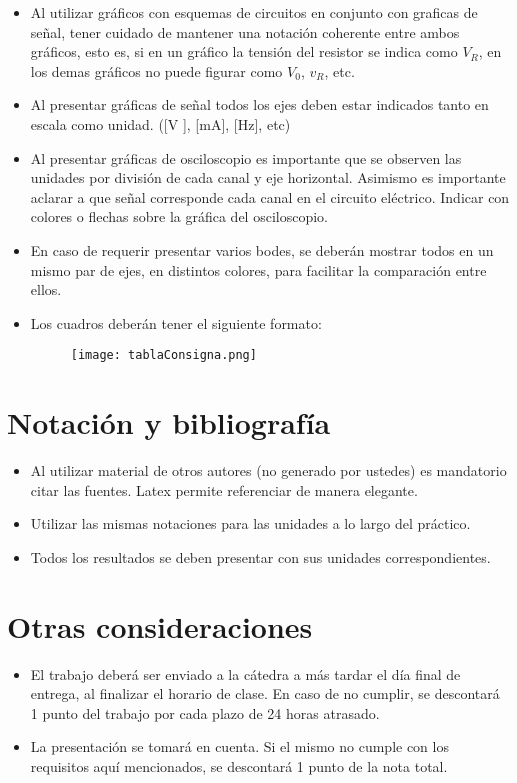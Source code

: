 \documentclass[10pt]{article}
\begin{document}
\begin{itemize}
    \item Al utilizar gráficos con esquemas de circuitos en conjunto con graficas de señal, tener cuidado de mantener una notación coherente entre ambos gráficos, esto es, si en un gráfico la tensión del resistor se indica como $V_R$, en los demas gráficos no puede figurar como $V_0$, $v_R$, etc.
    \item Al presentar gráficas de señal todos los ejes deben estar indicados tanto en escala como unidad. ([V ], [mA], [Hz], etc)
    \item Al presentar gráficas de osciloscopio es importante que se observen las unidades por división de cada canal y eje horizontal. Asimismo es importante aclarar a que señal corresponde cada canal en el circuito eléctrico. Indicar con colores o flechas sobre la gráfica del osciloscopio.
    \item En caso de requerir presentar varios bodes, se deberán mostrar todos en un mismo par de ejes, en distintos colores, para facilitar la comparación entre ellos.
    \item Los cuadros deberán tener el siguiente formato: 

    \begin{figure} [H]
        \centering
        \texttt{[image: tablaConsigna.png]}
    \end{figure}

\end{itemize}
    


\section{Notación y bibliografía}

\begin{itemize}
    \item Al utilizar material de otros autores (no generado por ustedes) es mandatorio citar las fuentes. Latex permite referenciar de manera elegante.
    \item Utilizar las mismas notaciones para las unidades a lo largo del práctico.
    \item Todos los resultados se deben presentar con sus unidades correspondientes.
\end{itemize}


\section{Otras consideraciones}

\begin{itemize}
    \item El trabajo deberá ser enviado a la cátedra a más tardar el día final de entrega, al finalizar el horario de clase. En caso de no cumplir, se descontará 1 punto del trabajo por cada plazo de 24 horas atrasado.
    \item La presentación se tomará en cuenta. Si el mismo no cumple con los requisitos aquí mencionados, se descontará 1 punto de la nota total.
\end{itemize}
\end{document}
